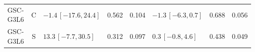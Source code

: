 \begin{longtable}{lcp{37mm}rrp{37mm}rr}
GSC-G3L6 & C & \(-1.4\,[-17.6,24.4]\) & 0.562 & 0.104 & \(-1.3\,[-6.3,0.7]\) & 0.688 & 0.056\\
GSC-G3L6 & S & \(13.3\,[-7.7,30.5]\) & 0.312 & 0.097 & \(0.3\,[-0.8,4.6]\) & 0.438 & 0.049\\

\end{longtable}
